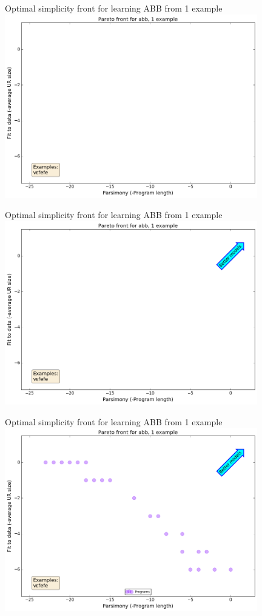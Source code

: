 \documentclass{beamer}
\begin{document}
\begin{frame}{Optimal simplicity front for learning ABB from  1 example}
  \centering  \includegraphics[width = 11cm]{marcusAnimation0.png}   
\end{frame}
\begin{frame}{Optimal simplicity front for learning ABB from  1 example}
  \centering  \includegraphics[width = 11cm]{marcusAnimation1.png}   
\end{frame}
\begin{frame}{Optimal simplicity front for learning ABB from  1 example}
  \centering  \includegraphics[width = 11cm]{marcusAnimation2.png}   
\end{frame}
\end{document}
